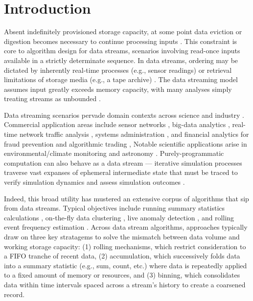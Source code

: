 \section{Introduction} \label{sec:introduction}

Absent indefinitely provisioned storage capacity, at some point data eviction or digestion becomes necessary to continue processing inputs \citep{gaber2005mining}.
This constraint is core to algorithm design for data streams, scenarios involving read-once inputs available in a strictly determinate sequence.
In data streams, ordering may be dictated by inherently real-time processes (e.g., sensor readings) or retrieval limitations of storage media (e.g., a tape archive) \citep{henzinger1998computing}.
The data streaming model assumes input greatly exceeds memory capacity, with many analyses simply treating streams as unbounded \citep{jiang2006research}.

Data streaming scenarios pervade domain contexts across science and industry \citep{aggarwal2009data,akidau2015dataflow}.
Commercial application areas include sensor networks \citep{elnahrawy2003research}, big-data analytics \citep{he2010comet}, real-time network traffic analysis \citep{johnson2005streams,muthukrishnan2005data}, systems administration \citep{fischer2012real}, and financial analytics for fraud prevention and algorithmic trading \citep{rajeshwari2016real,agarwal2009faster},
Notable scientific applications arise in environmental/climate monitoring \citep{hill2009real} and astronomy \citep{graham2012data}.
Purely-programmatic computation can also behave as a data stream --- iterative simulation processes traverse vast expanses of ephemeral intermediate state that must be traced to verify simulation dynamics and assess simulation outcomes \citep{abdulla2004simulation,schutzel2014stream}.

Indeed, this broad utility has mustered an extensive corpus of algorithms that sip from data streams.
Typical objectives include running summary statistics calculations \citep{lin2004continuously}, on-the-fly data clustering \citep{silva2013data}, live anomaly detection \citep{cai2004maids}, and rolling event frequency estimation \citep{manku2002approximate}.
Across data stream algorithms, approaches typically draw on three key stratagems to solve the mismatch between data volume and working storage capacity: (1) rolling mechanisms, which restrict consideration to a FIFO tranche of recent data, (2) accumulation, which successively folds data into a summary statistic (e.g., sum, count, etc.) where data is repeatedly applied to a fixed amount of memory or resources, and (3) binning, which consolidates data within time intervals spaced across a stream's history to create a coarsened record.

